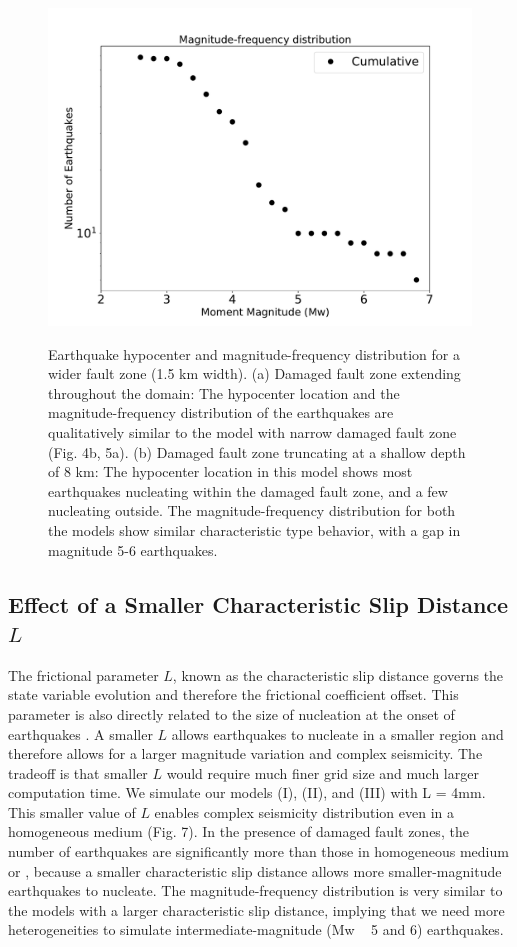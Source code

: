 \documentclass[11pt]{article}
\begin{document}
\begin{figure}[!htb]
{        \includegraphics[scale=0.25]{6b2.pdf}
    }
    \caption{Earthquake hypocenter and magnitude-frequency distribution for a wider fault zone (1.5 km width). (a) Damaged fault zone extending throughout the domain: The hypocenter location and the magnitude-frequency distribution of the earthquakes are qualitatively similar to the model with narrow damaged fault zone (Fig. 4b, 5a). (b) Damaged fault zone truncating at a shallow depth of 8 km: The hypocenter location in this model shows most earthquakes nucleating within the damaged fault zone, and a few nucleating outside. The magnitude-frequency distribution for both the models show similar characteristic type behavior, with a gap in magnitude 5-6 earthquakes.}
\end{figure}

\subsection{Effect of a Smaller Characteristic Slip Distance $L$}
The frictional parameter $L$, known as the characteristic slip distance governs the state variable evolution and therefore the frictional coefficient offset. This parameter is also directly related to the size of nucleation at the onset of earthquakes \citep{rubin_ampuero_2005}. A smaller $L$ allows earthquakes to nucleate in a smaller region and therefore allows for a larger magnitude variation and complex seismicity. The tradeoff is that smaller $L$ would require much finer grid size and much larger computation time. We simulate our models (I), (II), and (III) with L = 4mm. This smaller value of $L$ enables complex seismicity distribution even in a homogeneous medium (Fig. 7). In the presence of damaged fault zones, the number of earthquakes are significantly more than those in homogeneous medium or , because a smaller characteristic slip distance allows more smaller-magnitude earthquakes to nucleate. The magnitude-frequency distribution is very similar to the models with a larger characteristic slip distance, implying that we need more heterogeneities to simulate intermediate-magnitude (Mw ~ 5 and 6) earthquakes. 
\end{document}
